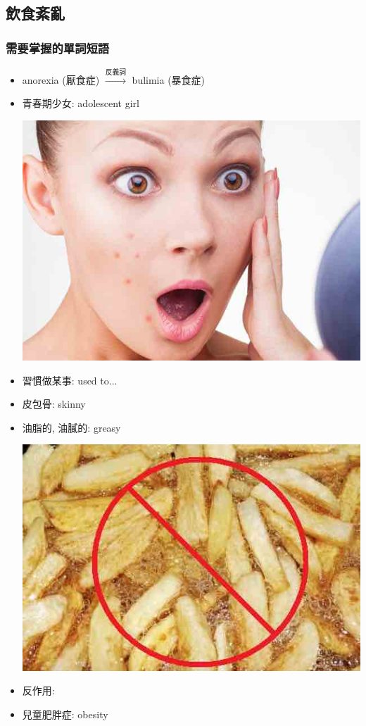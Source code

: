 \subsection{飲食紊亂}
\subsubsection*{需要掌握的單詞短語}
\begin{itemize}
  \itemsep0em
  \item anorexia (厭食症) $\xrightarrow{\text{反義詞}}$ bulimia (暴食症)
  \item 青春期少女: adolescent girl
  \begin{center}
    \includegraphics[scale=.4]{pics/adolescent}
  \end{center}
  \item 習慣做某事:  used to...
  \item 皮包骨: skinny
  \item 油脂的, 油膩的: greasy
  \begin{center}
    \includegraphics[scale=.5]{pics/greasy}
  \end{center}
  \item 反作用: 
  \item 兒童肥胖症:  obesity
\end{itemize}

